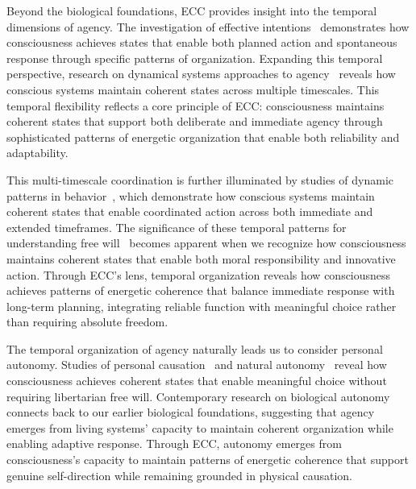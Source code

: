 Beyond the biological foundations, ECC provides insight into the temporal dimensions of agency. The investigation of effective intentions~\cite{Mele2009, amil2024theta} demonstrates how consciousness achieves states that enable both planned action and spontaneous response through specific patterns of organization. Expanding this temporal perspective, research on dynamical systems approaches to agency~\cite{Thompson2007, da2024mathematical} reveals how conscious systems maintain coherent states across multiple timescales. This temporal flexibility reflects a core principle of ECC: consciousness maintains coherent states that support both deliberate and immediate agency through sophisticated patterns of energetic organization that enable both reliability and adaptability.

This multi-timescale coordination is further illuminated by studies of dynamic patterns in behavior~\cite{Kelso1995, hunt2024electromagnetic}, which demonstrate how conscious systems maintain coherent states that enable coordinated action across both immediate and extended timeframes. The significance of these temporal patterns for understanding free will~\cite{Kane1996, kukushkin2024massed} becomes apparent when we recognize how consciousness maintains coherent states that enable both moral responsibility and innovative action. Through ECC's lens, temporal organization reveals how consciousness achieves patterns of energetic coherence that balance immediate response with long-term planning, integrating reliable function with meaningful choice rather than requiring absolute freedom.

The temporal organization of agency naturally leads us to consider personal autonomy. Studies of personal causation~\cite{OConnor2000, pinotsis2023cytoelectric} and natural autonomy~\cite{Walter2001, butlin2023consciousnessartificialintelligenceinsights} reveal how consciousness achieves coherent states that enable meaningful choice without requiring libertarian free will. Contemporary research on biological autonomy~\cite{Kauffman2000, van2025processes} connects back to our earlier biological foundations, suggesting that agency emerges from living systems' capacity to maintain coherent organization while enabling adaptive response. Through ECC, autonomy emerges from consciousness's capacity to maintain patterns of energetic coherence that support genuine self-direction while remaining grounded in physical causation.

